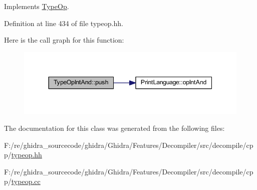 Implements \mbox{\hyperlink{class_type_op_ac9c9544203ed74dabe6ac662b653b2af}{Type\+Op}}.



Definition at line 434 of file typeop.\+hh.

Here is the call graph for this function\+:
\nopagebreak
\begin{figure}[H]
\begin{center}
\leavevmode
\includegraphics[width=344pt]{class_type_op_int_and_a589ee5be6f2e2b381a0c389b47fff39f_cgraph}
\end{center}
\end{figure}


The documentation for this class was generated from the following files\+:\begin{DoxyCompactItemize}
\item 
F\+:/re/ghidra\+\_\+sourcecode/ghidra/\+Ghidra/\+Features/\+Decompiler/src/decompile/cpp/\mbox{\hyperlink{typeop_8hh}{typeop.\+hh}}\item 
F\+:/re/ghidra\+\_\+sourcecode/ghidra/\+Ghidra/\+Features/\+Decompiler/src/decompile/cpp/\mbox{\hyperlink{typeop_8cc}{typeop.\+cc}}\end{DoxyCompactItemize}
